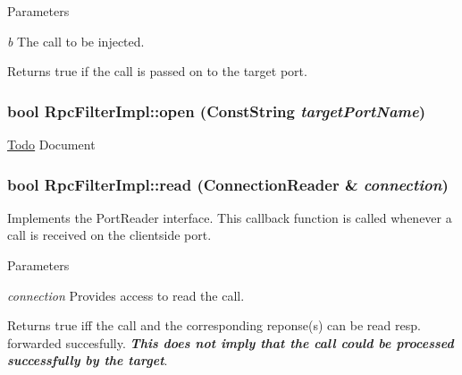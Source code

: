 \begin{DoxyParams}{Parameters}
\item[{\em b}]The call to be injected. \end{DoxyParams}
\begin{DoxyReturn}{Returns}
{\ttfamily true} if the call is passed on to the target port. 
\end{DoxyReturn}
\hypertarget{classyarp_1_1os_1_1impl_1_1_rpc_filter_impl_a9ee7fb8756ba19285866308cdf1d60c2}{
\subsubsection[{open}]{\setlength{\rightskip}{0pt plus 5cm}bool RpcFilterImpl::open (ConstString {\em targetPortName})}}
\label{classyarp_1_1os_1_1impl_1_1_rpc_filter_impl_a9ee7fb8756ba19285866308cdf1d60c2}
\begin{Desc}
\item[\hyperlink{todo__todo000002}{Todo}]Document \end{Desc}
\hypertarget{classyarp_1_1os_1_1impl_1_1_rpc_filter_impl_ab8ff43bc5f1f926aa49185818fdfe3b7}{
\subsubsection[{read}]{\setlength{\rightskip}{0pt plus 5cm}bool RpcFilterImpl::read (ConnectionReader \& {\em connection})}}
\label{classyarp_1_1os_1_1impl_1_1_rpc_filter_impl_ab8ff43bc5f1f926aa49185818fdfe3b7}
Implements the PortReader interface. This callback function is called whenever a call is received on the clientside port. 
\begin{DoxyParams}{Parameters}
\item[{\em connection}]Provides access to read the call. \end{DoxyParams}
\begin{DoxyReturn}{Returns}
true iff the call and the corresponding reponse(s) can be read resp. forwarded succesfully. {\itshape {\bfseries This does not imply that the call could be processed successfully by the target}\/}. 
\end{DoxyReturn}
